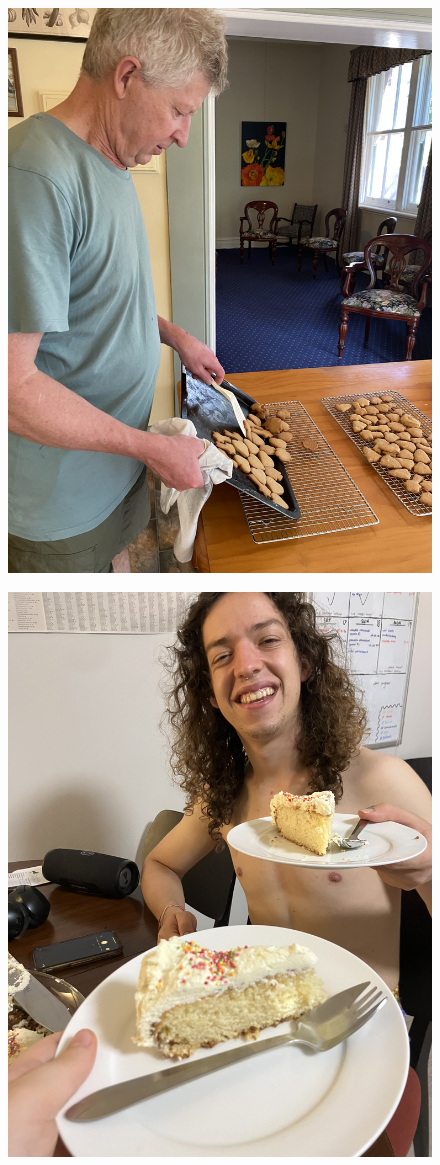\documentclass[]{article}
\begin{document}
\newpage\begin{figure}[H]
\begin{center}\hyperref[rec:Gingerbread Biscuits]{\includegraphics[keepaspectratio,width=\textheight,height=\textwidth,angle=-90]{Gallery/Gingerbread Biscuits}}\caption*{}\label{fig:Gingerbread Biscuits}\end{center}
\end{figure}
\newpage\begin{figure}[H]
\begin{center}\hyperref[rec:Vanilla Butter Cake]{\includegraphics[keepaspectratio,width=\textheight,height=\textwidth,angle=-90]{Gallery/Vanilla Butter Cake}}\caption*{}\label{fig:Vanilla Butter Cake}\end{center}
\end{figure}
\end{document}
